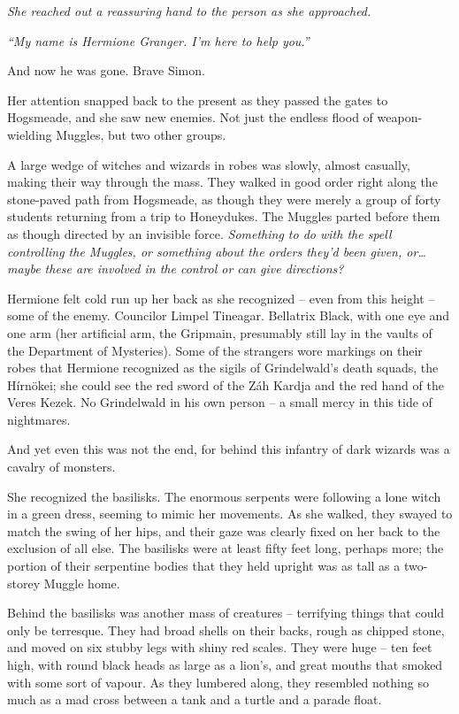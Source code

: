 \emph{She reached out a reassuring hand to the person as she
approached.}

\emph{``My name is Hermione Granger. I'm here to help you.''}

And now he was gone. Brave Simon.

Her attention snapped back to the present as they passed the gates to
Hogsmeade, and she saw new enemies. Not just the endless flood of
weapon-wielding Muggles, but two other groups.

A large wedge of witches and wizards in robes was slowly, almost
casually, making their way through the mass. They walked in good order
right along the stone-paved path from Hogsmeade, as though they were
merely a group of forty students returning from a trip to Honeydukes.
The Muggles parted before them as though directed by an invisible force.
\emph{Something to do with the spell controlling the Muggles, or
something about the orders they'd been given, or\ldots{} maybe these are
involved in the control or can give directions?}

Hermione felt cold run up her back as she recognized -- even from this
height -- some of the enemy. Councilor Limpel Tineagar. Bellatrix Black,
with one eye and one arm (her artificial arm, the Gripmain, presumably
still lay in the vaults of the Department of Mysteries). Some of the
strangers wore markings on their robes that Hermione recognized as the
sigils of Grindelwald's death squads, the Hírnökei; she could see the
red sword of the Záh Kardja and the red hand of the Veres Kezek. No
Grindelwald in his own person -- a small mercy in this tide of
nightmares.

And yet even this was not the end, for behind this infantry of dark
wizards was a cavalry of monsters.

She recognized the basilisks. The enormous serpents were following a
lone witch in a green dress, seeming to mimic her movements. As she
walked, they swayed to match the swing of her hips, and their gaze was
clearly fixed on her back to the exclusion of all else. The basilisks
were at least fifty feet long, perhaps more; the portion of their
serpentine bodies that they held upright was as tall as a two-storey
Muggle home.

Behind the basilisks was another mass of creatures -- terrifying things
that could only be terresque. They had broad shells on their backs,
rough as chipped stone, and moved on six stubby legs with shiny red
scales. They were huge -- ten feet high, with round black heads as large
as a lion's, and great mouths that smoked with some sort of vapour. As
they lumbered along, they resembled nothing so much as a mad cross
between a tank and a turtle and a parade float.

